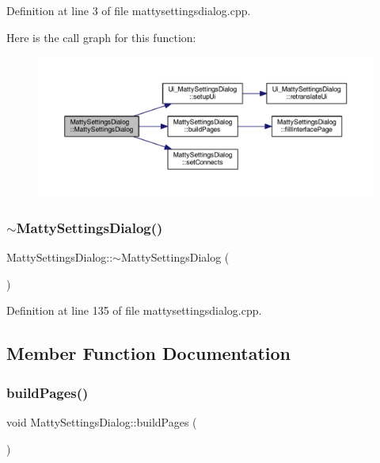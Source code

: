 Definition at line 3 of file mattysettingsdialog.\+cpp.

Here is the call graph for this function\+:
\nopagebreak
\begin{figure}[H]
\begin{center}
\leavevmode
\includegraphics[width=350pt]{classMattySettingsDialog_a609bf8d82968105e72cf497216230451_cgraph}
\end{center}
\end{figure}
\hypertarget{classMattySettingsDialog_ae04421f7937d00dc4e05856d78e10d9a}{}\label{classMattySettingsDialog_ae04421f7937d00dc4e05856d78e10d9a} 
\subsubsection{\texorpdfstring{$\sim$\+Matty\+Settings\+Dialog()}{~MattySettingsDialog()}}
{\footnotesize\ttfamily Matty\+Settings\+Dialog\+::$\sim$\+Matty\+Settings\+Dialog (\begin{DoxyParamCaption}{ }\end{DoxyParamCaption})}



Definition at line 135 of file mattysettingsdialog.\+cpp.



\subsection{Member Function Documentation}
\hypertarget{classMattySettingsDialog_a92444461b31265858791d279e483069d}{}\label{classMattySettingsDialog_a92444461b31265858791d279e483069d} 
\subsubsection{\texorpdfstring{build\+Pages()}{buildPages()}}
{\footnotesize\ttfamily void Matty\+Settings\+Dialog\+::build\+Pages (\begin{DoxyParamCaption}{ }\end{DoxyParamCaption})\hspace{0.3cm}{\ttfamily [private]}}



